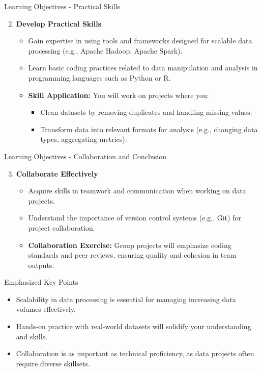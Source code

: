 \documentclass[aspectratio=169]{beamer}
\begin{document}
\begin{frame}[fragile]{Learning Objectives - Practical Skills}
    \begin{enumerate}
        \setcounter{enumi}{1} %
        \item \textbf{Develop Practical Skills}
        \begin{itemize}
            \item Gain expertise in using tools and frameworks designed for scalable data processing (e.g., Apache Hadoop, Apache Spark).
            \item Learn basic coding practices related to data manipulation and analysis in programming languages such as Python or R.
            \item \textbf{Skill Application:} You will work on projects where you:
            \begin{itemize}
                \item Clean datasets by removing duplicates and handling missing values.
                \item Transform data into relevant formats for analysis (e.g., changing data types, aggregating metrics).
            \end{itemize}
        \end{itemize}
    \end{enumerate}
\end{frame}

\begin{frame}[fragile]{Learning Objectives - Collaboration and Conclusion}
    \begin{enumerate}
        \setcounter{enumi}{2} %
        \item \textbf{Collaborate Effectively}
        \begin{itemize}
            \item Acquire skills in teamwork and communication when working on data projects.
            \item Understand the importance of version control systems (e.g., Git) for project collaboration.
            \item \textbf{Collaboration Exercise:} Group projects will emphasize coding standards and peer reviews, ensuring quality and cohesion in team outputs.
        \end{itemize}
    \end{enumerate}
    \begin{block}{Emphasized Key Points}
        \begin{itemize}
            \item Scalability in data processing is essential for managing increasing data volumes effectively.
            \item Hands-on practice with real-world datasets will solidify your understanding and skills.
            \item Collaboration is as important as technical proficiency, as data projects often require diverse skillsets.
        \end{itemize}
    \end{block}
\end{frame}
\end{document}
